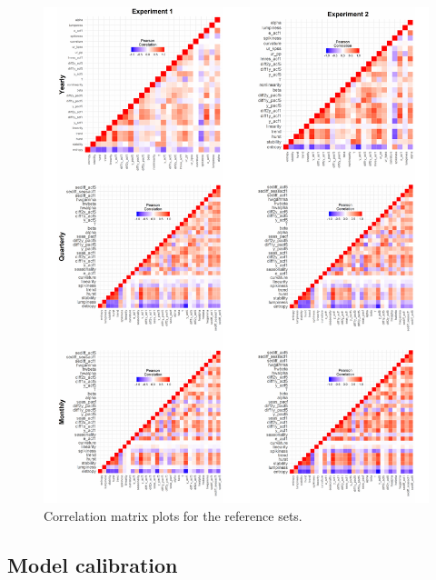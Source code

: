 \documentclass[11pt,a4paper,]{article}
\begin{document}
\begin{figure}

{\centering \includegraphics[width=\textwidth]{figure/cormatplots-1} 

}

\caption{ Correlation matrix plots for the reference sets.}\label{fig:cormatplots}
\end{figure}

\hypertarget{model-calibration}{%
\subsection{Model calibration}\label{model-calibration}}
\end{document}
